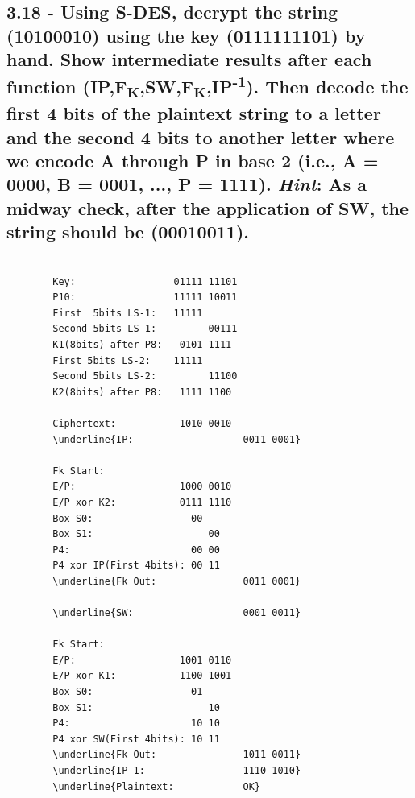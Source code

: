 \documentclass[
    article,            %
    11pt,               %
    oneside,            %
    a4paper,            %
    english,            %
    brazil,             %
    sumario=tradicional,
    ]{abntex2}
\begin{document}
\subsection*{\textbf{3.18 - Using S-DES, decrypt the string (10100010) using the key (0111111101) by hand. Show intermediate results after each function (IP,F\textsubscript{K},SW,F\textsubscript{K},IP\textsuperscript{-1}). Then decode the first 4 bits of the plaintext string to a letter and the second 4 bits to another letter where we encode A through P in base 2 (i.e., A = 0000, B = 0001, ..., P = 1111). \textit{Hint}: As a midway check, after the application of SW, the string should be (00010011).}}

\begin{Verbatim}[commandchars=\\\{\}, fontsize=\footnotesize]

        Key:                 01111 11101
        P10:                 11111 10011
        First  5bits LS-1:   11111
        Second 5bits LS-1:         00111
        K1(8bits) after P8:   0101 1111
        First 5bits LS-2:    11111 
        Second 5bits LS-2:         11100
        K2(8bits) after P8:   1111 1100

        Ciphertext:           1010 0010
        \underline{IP:                   0011 0001}

        Fk Start:
        E/P:                  1000 0010  
        E/P xor K2:           0111 1110
        Box S0:                 00
        Box S1:                    00
        P4:                     00 00
        P4 xor IP(First 4bits): 00 11
        \underline{Fk Out:               0011 0001}

        \underline{SW:                   0001 0011}

        Fk Start:
        E/P:                  1001 0110  
        E/P xor K1:           1100 1001
        Box S0:                 01
        Box S1:                    10
        P4:                     10 10 
        P4 xor SW(First 4bits): 10 11 
        \underline{Fk Out:               1011 0011}
        \underline{IP-1:                 1110 1010}
        \underline{Plaintext:            OK}
\end{Verbatim}

% 


\postextual

\nocite{Stallings:2010:CNS:1824151}

\end{document}
